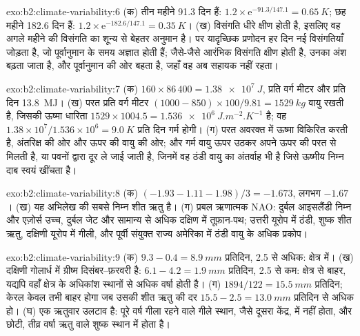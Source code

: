\begin{solution}{exo:b2:climate-variability:6}
(क) तीन महीने 91.3 दिन हैं: $1.2 \times \mathrm{e}^{-91.3/147.1} = \qty{0.65}{K}$; छह महीने
182.6 दिन हैं: $1.2 \times \mathrm{e}^{-182.6/147.1} = \qty{0.35}{K}$। (ख) विसंगति
धीरे क्षीण होती है, इसलिए वह अगले महीने की विसंगति का शून्य से बेहतर अनुमान है। पर यादृच्छिक प्रणोदन
हर दिन नई विसंगतियाँ जोड़ता है, जो पूर्वानुमान के समय अज्ञात होती हैं; जैसे-जैसे आरंभिक विसंगति क्षीण होती है,
उनका अंश बढ़ता जाता है, और पूर्वानुमान  की ओर बहता है, जहाँ वह अब
सहायक नहीं रहता।
\end{solution}

\begin{solution}{exo:b2:climate-variability:7}
(क) $160 \times 86\,400 = \qty{1.38e7}{J}$, प्रति वर्ग मीटर और प्रति दिन \qty{13.8}{MJ}। (ख) परत
प्रति वर्ग मीटर $(1000 - 850) \times 100/9.81 = \qty{1529}{kg}$ वायु रखती है, जिसकी ऊष्मा
धारिता $1529 \times 1004.5 = \qty{1.536e6}{J.m^{-2}.K^{-1}}$ है; वह $1.38 \times
10^7/1.536 \times 10^6 = \qty{9.0}{K}$ प्रति दिन गर्म होगी। (ग) परत अवरक्त में ऊष्मा विकिरित करती है,
अंतरिक्ष की ओर और ऊपर की वायु की ओर; और गर्म वायु ऊपर उठकर अपने ऊपर की परत से मिलती है, या
पवनों द्वारा दूर ले जाई जाती है, जिनमें वह ठंडी वायु का अंतर्वाह भी है जिसे ऊष्मीय निम्न दाब स्वयं खींचता है।
\end{solution}

\begin{solution}{exo:b2:climate-variability:8}
(क) $(-1.93 - 1.11 - 1.98)/3 = -1.673$, लगभग $-1.67$। (ख) यह अभिलेख की सबसे निम्न शीत ऋतु है।
(ग) प्रबल ऋणात्मक NAO: दुर्बल आइसलैंडी निम्न और एज़ोर्स उच्च, दुर्बल जेट और सामान्य से
अधिक दक्षिण में तूफ़ान-पथ; उत्तरी यूरोप में ठंडी, शुष्क शीत ऋतु, दक्षिणी यूरोप में गीली,
और पूर्वी संयुक्त राज्य अमेरिका में ठंडी वायु के अधिक प्रकोप।
\end{solution}

\begin{solution}{exo:b2:climate-variability:9}
(क) $9.3 - 0.4 = \qty{8.9}{mm}$ प्रतिदिन, 2.5 से अधिक: क्षेत्र में। (ख) दक्षिणी गोलार्ध में
ग्रीष्म दिसंबर--फ़रवरी है: $6.1 - 4.2 = \qty{1.9}{mm}$ प्रतिदिन, 2.5 से कम: क्षेत्र से बाहर,
यद्यपि वहाँ क्षेत्र के अधिकांश स्थानों से अधिक वर्षा होती है। (ग) $1894/122 = \qty{15.5}{mm}$
प्रतिदिन; केरल केवल तभी बाहर होगा जब उसकी शीत ऋतु की दर $15.5 - 2.5 = \qty{13.0}{mm}$ प्रतिदिन से अधिक हो।
(घ)  एक ऋतुवार उलटाव है: पूरे वर्ष गीला रहने वाले गीले स्थान, जैसे दूसरा
केंद्र, में  नहीं होता, और छोटी, तीव्र वर्षा ऋतु वाले शुष्क स्थान में होता है।
\end{solution}

